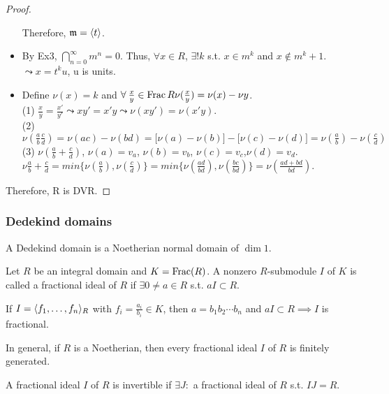 \begin{prop}
\begin{proof}
\begin{itemize}
        Therefore, $\mathfrak{m} = \langle t\rangle$.
      \item By Ex3, $\bigcap\limits_{n = 0}^{\infty} m^n = 0$. Thus, $\forall x \in R$,
        $\exists! k$ s.t. $x \in m^k$ and $x \notin m^k+1$. $\leadsto x = t^ku$,
        u is units.
      \item Define $\nu(x) = k$ and $\forall \frac{x}{y} \in \Frac{R} 
        \nu(\frac{x}{y}) = \nu(x) - \nu{y}$. \\
        (1) $\frac{x}{y} = \frac{x'}{y'} \leadsto xy' = x'y \leadsto \nu(xy') = 
        \nu(x'y)$. \\
        (2) $\nu(\frac{a}{b} \frac{c}{d}) = \nu(ac) - \nu(bd) = \big[\nu(a) - 
        \nu(b)\big] - \big[\nu(c) - \nu(d)\big] = \nu(\frac{a}{b}) - \nu(\frac{c}{d})$ \\
        (3) $\nu(\frac{a}{b} + \frac{c}{d})$, $\nu(a) = v_a$, $\nu(b) = v_b$,
        $\nu(c) = v_c$,$\nu(d) = v_d$. $\nu{\frac{a}{b} + \frac{c}{d}} = 
        min\big\{\nu(\frac{a}{b}), \nu(\frac{c}{d})\big\} = min\big\{\nu(\frac{ad}{bd}), 
        \nu(\frac{bc}{bd})\big\} = \nu(\frac{ad + bd}{bd})$. \\
    \end{itemize}
    Therefore, R is DVR.
  \end{proof}
\end{prop}

\subsubsection{Dedekind domains}
\begin{definition}
  A Dedekind domain is a Noetherian normal domain of $\dim 1$.
\end{definition}

\begin{definition}
  Let $R$ be an integral domain and $K = \operatorname{Frac}(R)$.
  A nonzero $R$-submodule $I$ of $K$ is called a fractional ideal of $R$ if
  $\exists 0 \ne a \in R$ s.t. $aI \subset R$.
\end{definition}

\begin{example}
  If $I = \langle f_1, \dots, f_n\rangle_R$ with $f_i = \frac{a_i}{b_i} \in K$, then
  $a = b_1b_2 \dotsm b_n$ and $aI \subset R \implies I$ is fractional.

  In general, if $R$ is a Noetherian, then every fractional ideal $I$ of $R$
  is finitely generated.
\end{example}

\begin{definition}
  A fractional ideal $I$ of $R$ is invertible if $\exists J:$ a fractional ideal
  of $R$ s.t. $IJ = R$.
\end{definition}

